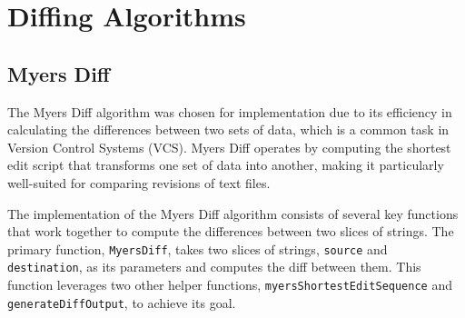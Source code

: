 \section{Diffing Algorithms}

\subsection{Myers Diff}
The Myers Diff algorithm was chosen for implementation due to its efficiency in calculating the differences between two sets of data, which is a common task in Version Control Systems (VCS). Myers Diff operates by computing the shortest edit script that transforms one set of data into another, making it particularly well-suited for comparing revisions of text files.
\smallskip

The implementation of the Myers Diff algorithm consists of several key functions that work together to compute the differences between two slices of strings. The primary function, \lstinline{MyersDiff}, takes two slices of strings, \lstinline{source} and \lstinline{destination}, as its parameters and computes the diff between them. This function leverages two other helper functions, \lstinline{myersShortestEditSequence} and \lstinline{generateDiffOutput}, to achieve its goal.

